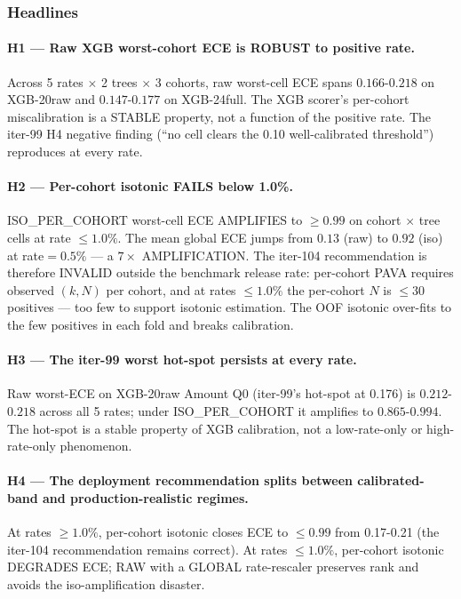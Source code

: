 \documentclass{article}
\begin{document}
\subsubsection{Headlines}

\paragraph{H1 --- Raw XGB worst-cohort ECE is ROBUST to positive rate.}
Across 5 rates $\times$ 2 trees $\times$ 3 cohorts, raw worst-cell ECE
spans $0.166$-$0.218$ on XGB-20raw and $0.147$-$0.177$ on XGB-24full.
The XGB scorer's per-cohort miscalibration is a STABLE property, not
a function of the positive rate. The iter-99 H4 negative finding
(``no cell clears the 0.10 well-calibrated threshold'') reproduces at
every rate.

\paragraph{H2 --- Per-cohort isotonic FAILS below 1.0\%.} ISO\_PER\_COHORT
worst-cell ECE AMPLIFIES to $\ge 0.99$ on cohort $\times$ tree cells at
rate $\le 1.0\%$. The mean global ECE jumps from $0.13$ (raw) to
$0.92$ (iso) at rate$=0.5\%$ --- a $7\times$ AMPLIFICATION. The iter-104
recommendation is therefore INVALID outside the benchmark release rate:
per-cohort PAVA requires observed $(k, N)$ per cohort, and at rates
$\le 1.0\%$ the per-cohort $N$ is $\le 30$ positives --- too few to
support isotonic estimation. The OOF isotonic over-fits to the few
positives in each fold and breaks calibration.

\paragraph{H3 --- The iter-99 worst hot-spot persists at every rate.}
Raw worst-ECE on XGB-20raw Amount Q0 (iter-99's hot-spot at 0.176) is
$0.212$-$0.218$ across all 5 rates; under ISO\_PER\_COHORT it amplifies
to $0.865$-$0.994$. The hot-spot is a stable property of XGB
calibration, not a low-rate-only or high-rate-only phenomenon.

\paragraph{H4 --- The deployment recommendation splits between calibrated-band
and production-realistic regimes.} At rates $\ge 1.0\%$, per-cohort
isotonic closes ECE to $\le 0.99$ from 0.17-0.21 (the iter-104
recommendation remains correct). At rates $\le 1.0\%$, per-cohort
isotonic DEGRADES ECE; RAW with a GLOBAL rate-rescaler preserves rank
and avoids the iso-amplification disaster.
\end{document}
